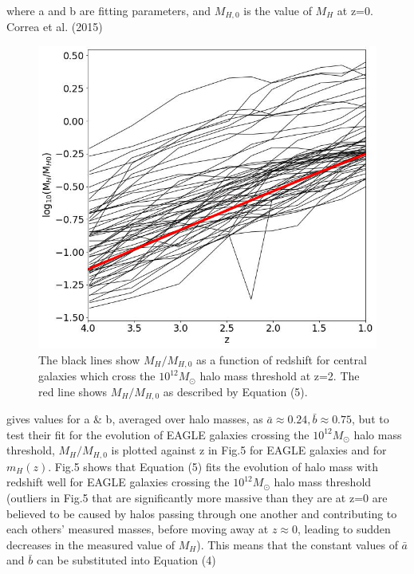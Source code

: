 \documentclass[12pt, twocolumn]{revtex4}    %
\begin{document}
\noindent where a and b are fitting parameters, and $M_{H,0}$ is the value of $M_H$ at z=0. Correa et al. (2015)

\onecolumngrid


\begin{figure}[H]
\centering
\includegraphics[width=\linewidth]{Plot_5.jpeg}
\caption{The black lines show $M_H/M_{H,0}$ as a function of redshift for central galaxies which cross the $10^{12}M_\odot$ halo mass threshold at z=2. The red line shows $M_H/M_{H,0}$ as described by Equation (5).}
\label{fig:5}
\end{figure}
\clearpage
\twocolumngrid


\noindent gives values for a \& b, averaged over halo masses, as $\bar a \approx 0.24, \bar b \approx 0.75$, but to test their fit for the evolution of EAGLE galaxies crossing the $10^{12}M_\odot$ halo mass threshold, $M_H/M_{H,0}$ is plotted against z in Fig.5 for EAGLE galaxies and for $m_H(z)$. Fig.5 shows that Equation (5) fits the evolution of halo mass with redshift well for EAGLE galaxies crossing the $10^{12}M_\odot$ halo mass threshold (outliers in Fig.5 that are significantly more massive than they are at z=0 are believed to be caused by halos passing through one another and contributing to each others' measured masses, before moving away at $z\approx0$, leading to  sudden decreases in the measured value of $M_H$). This means that the constant values of $\bar a$ and $\bar b$ can be substituted into Equation (4)
\end{document}

